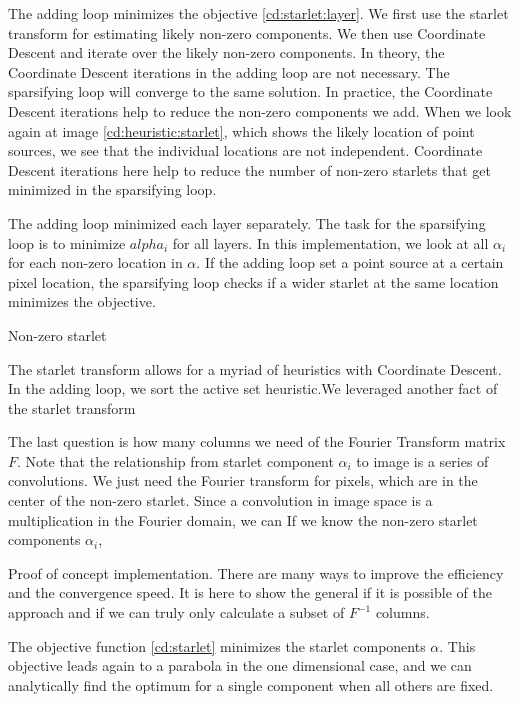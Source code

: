 The adding loop minimizes the objective \eqref{cd:starlet:layer}. We first use the starlet transform for estimating likely non-zero components. We then use Coordinate Descent and iterate over the likely non-zero components. In theory, the Coordinate Descent iterations in the adding loop are not necessary. The sparsifying loop will converge to the same solution. In practice, the Coordinate Descent iterations help to reduce the non-zero components we add. When we look again at image \ref{cd:heuristic:starlet}, which shows the likely location of point sources, we see that the individual locations are not independent. Coordinate Descent iterations here help to reduce the number of non-zero starlets that get minimized in the sparsifying loop.

The adding loop minimized each layer separately. The task for the sparsifying loop is to minimize $alpha_i$ for all layers. In this implementation, we look at all $\alpha_i$ for each non-zero location in $\alpha$. If the adding loop set a point source at a certain pixel location, the sparsifying loop checks if a wider starlet at the same location minimizes the objective.

Non-zero starlet

The starlet transform allows for a myriad of heuristics with Coordinate Descent. In the adding loop, we sort the active set heuristic.We leveraged another fact of the starlet transform 







The last question is how many columns we need of the Fourier Transform matrix $F$. Note that the relationship from starlet component $\alpha_i$ to image is a series of convolutions. We just need the Fourier transform for pixels, which are in the center of the non-zero starlet. Since a convolution in image space is a multiplication in the Fourier domain, we can 
If we know the non-zero starlet components $\alpha_i$, 


Proof of concept implementation. There are many ways to improve the efficiency and the convergence speed. It is here to show  the general if it is possible of the approach and if we can truly only calculate a subset of $F^{-1}$ columns.

The objective function \eqref{cd:starlet} minimizes the starlet components $\alpha$. This objective leads again to a parabola in the one dimensional case, and we can analytically find the optimum for a single component when all others are fixed. 



